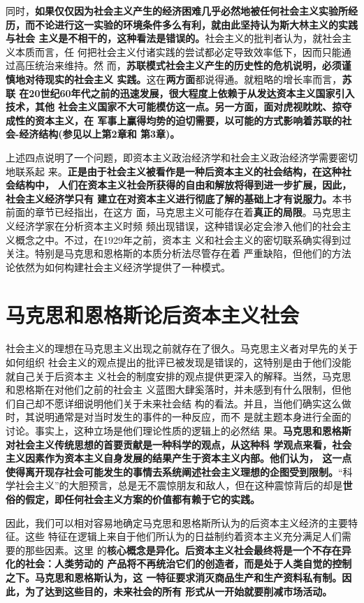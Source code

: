 同时，\textbf{如果仅仅因为社会主义产生的经济困难几乎必然地被任何社会主义实验所经
  历，而不论进行这一实验的环境条件多么有利，就由此坚持认为斯大林主义的实践与社会
  主义是不相干的，这种看法是错误的。}社会主义的批判者认为，就社会主义本质而言，任
何把社会主义付诸实践的尝试都必定导致效率低下，因而只能通过高压统治来维持。然
而，\textbf{苏联模式社会主义产生的历史性的危机说明，必须谨慎地对待现实的社会主义
  实践。}这在\textbf{两方面}都说得通。就粗略的增长率而言，\textbf{苏联
  在20世纪60年代之前的迅速发展，很大程度上依赖于从发达资本主义国家引入技术，其他
  社会主义国家不大可能模仿这一点。另一方面，面对虎视眈眈、掠夺成性的资本主义，在
  军事上赢得均势的迫切需要，以可能的方式影响着苏联的社会-经济结构(参见以上第2章和
  第3章)。}

上述四点说明了一个问题，即资本主义政治经济学和社会主义政治经济学需要密切地联系起
来。\textbf{正是由于社会主义被看作是一种后资本主义的社会结构，在这种社会结构中，
  人们在资本主义社会所获得的自由和解放将得到进一步扩展，因此，社会主义经济学只有
  建立在对资本主义进行彻底了解的基础上才有说服力。}本书前面的章节已经指出，在这方
面，马克思主义可能存在着\textbf{真正的局限}。马克思主义经济学家在分析资本主义时频
频出现错误，这种错误必定会渗入他们的社会主义概念之中。不过，在1929年之前，资本主
义和社会主义的密切联系确实得到过关注。特别是马克思和恩格斯的本质分析法尽管存在着
严重缺陷，但他们的方法论依然为如何构建社会主义经济学提供了一种模式。

\section{马克思和恩格斯论后资本主义社会}

社会主义的理想在马克思主义出现之前就存在了很久。马克思主义者对早先的关于如何组织
社会主义的观点提出的批评已被发现是错误的，这特别是由于他们没能就自己关于后资本主
义社会的制度安排的观点提供更深入的解释。当然，马克思和恩格斯在对他们之前的社会主
义蓝图大肆奚落时，并未感到有什么限制，但他们自己却不愿详细说明他们关于未来社会结
构的看法。并且，当他们确实这么做时，其说明通常是对当时发生的事件的一种反应，而不
是就主题本身进行全面的讨论。事实上，这种立场是他们理论性质的逻辑上的必然结
果。\textbf{马克思和恩格斯对社会主义传统思想的首要贡献是一种科学的观点，从这种科
  学观点来看，社会主义因素作为资本主义自身发展的结果产生于资本主义内部。他们认为，
  这一点使得离开现存社会可能发生的事情去系统阐述社会主义理想的企图受到限制。}“科
学社会主义”的大胆预言，总是无不震惊朋友和敌人，但在这种震惊背后的却是\textbf{世
  俗的假定，即任何社会主义方案的价值都有赖于它的实践。}

因此，我们可以相对容易地确定马克思和恩格斯所认为的后资本主义经济的主要特征。这些
特征在逻辑上来自于他们所认为的日益制约着资本主义充分满足人们需要的那些因素。这里
的\textbf{核心概念是异化。后资本主义社会最终将是一个不存在异化的社会：人类劳动的
  产品将不再统治它们的创造者，而是处于人类自觉的控制之下。马克思和恩格斯认为，这
  一特征要求消灭商品生产和生产资料私有制。因此，为了达到这些目的，未来社会的所有
  形式从一开始就要削减市场活动。}

